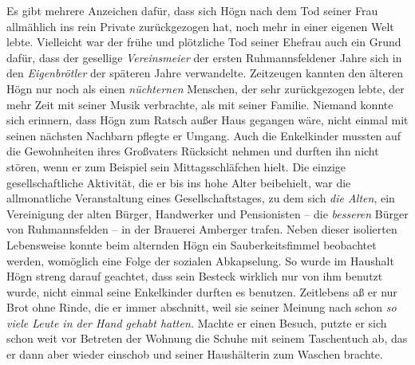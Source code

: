 Es gibt mehrere Anzeichen dafür, dass sich Högn nach dem Tod seiner Frau
allmählich ins rein Private zurückgezogen hat, noch mehr in einer
eigenen Welt lebte. Vielleicht war der frühe und plötzliche Tod seiner
Ehefrau auch ein Grund dafür, dass der gesellige \textit{Vereinsmeier}
der ersten Ruhmannsfeldener Jahre sich in den \textit{Eigenbrötler}
der späteren Jahre verwandelte. Zeitzeugen kannten den älteren Högn
nur noch als einen \textit{nüchternen} Menschen, der sehr zurückgezogen
lebte, der mehr Zeit mit seiner Musik verbrachte, als mit seiner
Familie. Niemand konnte sich erinnern, dass Högn zum Ratsch außer Haus
gegangen wäre, nicht einmal mit seinen nächsten Nachbarn pflegte er
Umgang. Auch die Enkelkinder mussten auf die Gewohnheiten ihres
Großvaters Rücksicht nehmen und durften ihn nicht stören, wenn er zum
Beispiel sein Mittagsschläfchen hielt. Die einzige gesellschaftliche
Aktivität, die er bis ins hohe Alter beibehielt, war die allmonatliche
Veranstaltung eines Gesellschaftstages, zu dem sich \textit{die
Alten}, ein Vereinigung der alten Bürger, Handwerker und Pensionisten
– die \textit{besseren} Bürger von Ruhmannsfelden – in der Brauerei
Amberger trafen. Neben dieser isolierten Lebensweise konnte beim
alternden Högn ein Sauberkeitsfimmel beobachtet werden, womöglich eine
Folge der sozialen Abkapselung. So wurde im Haushalt Högn streng darauf
geachtet, dass sein Besteck wirklich nur von ihm benutzt wurde, nicht
einmal seine Enkelkinder durften es benutzen. Zeitlebens aß er nur Brot
ohne Rinde, die er immer abschnitt, weil sie seiner Meinung nach schon
\textit{so viele Leute in der Hand gehabt hatten.} Machte er einen
Besuch, putzte er sich schon weit vor Betreten der Wohnung die Schuhe
mit seinem Taschentuch ab, das er dann aber wieder einschob und seiner
Haushälterin zum Waschen brachte.